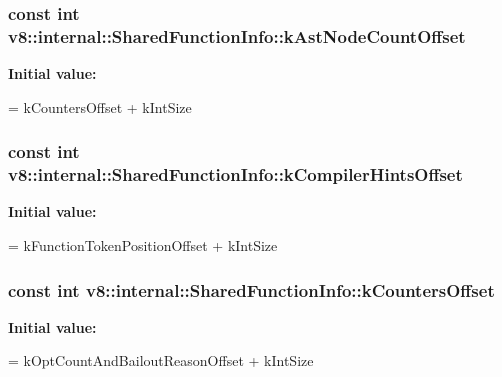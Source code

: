 \subsubsection[{k\+Ast\+Node\+Count\+Offset}]{\setlength{\rightskip}{0pt plus 5cm}const int v8\+::internal\+::\+Shared\+Function\+Info\+::k\+Ast\+Node\+Count\+Offset\hspace{0.3cm}{\ttfamily [static]}}\label{classv8_1_1internal_1_1_shared_function_info_a51f5c186495c39310685bbb6b8d96176}
{\bfseries Initial value\+:}
\begin{DoxyCode}
=
      kCountersOffset + kIntSize
\end{DoxyCode}
\hypertarget{classv8_1_1internal_1_1_shared_function_info_aac0cd24ab277a88fe1e97ae87ebff883}{}
\subsubsection[{k\+Compiler\+Hints\+Offset}]{\setlength{\rightskip}{0pt plus 5cm}const int v8\+::internal\+::\+Shared\+Function\+Info\+::k\+Compiler\+Hints\+Offset\hspace{0.3cm}{\ttfamily [static]}}\label{classv8_1_1internal_1_1_shared_function_info_aac0cd24ab277a88fe1e97ae87ebff883}
{\bfseries Initial value\+:}
\begin{DoxyCode}
=
      kFunctionTokenPositionOffset + kIntSize
\end{DoxyCode}
\hypertarget{classv8_1_1internal_1_1_shared_function_info_ae51c0d833ac9861d08d0732797ff5bdc}{}
\subsubsection[{k\+Counters\+Offset}]{\setlength{\rightskip}{0pt plus 5cm}const int v8\+::internal\+::\+Shared\+Function\+Info\+::k\+Counters\+Offset\hspace{0.3cm}{\ttfamily [static]}}\label{classv8_1_1internal_1_1_shared_function_info_ae51c0d833ac9861d08d0732797ff5bdc}
{\bfseries Initial value\+:}
\begin{DoxyCode}
=
      kOptCountAndBailoutReasonOffset + kIntSize
\end{DoxyCode}
\hypertarget{classv8_1_1internal_1_1_shared_function_info_a72e034f92ee4560197968f5b89fa6672}{}
